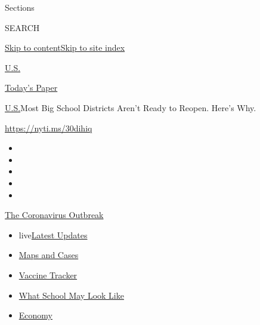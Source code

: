 Sections

SEARCH

\protect\hyperlink{site-content}{Skip to
content}\protect\hyperlink{site-index}{Skip to site index}

\href{https://www.nytimes3xbfgragh.onion/section/us}{U.S.}

\href{https://myaccount.nytimes3xbfgragh.onion/auth/login?response_type=cookie\&client_id=vi}{}

\href{https://www.nytimes3xbfgragh.onion/section/todayspaper}{Today's
Paper}

\href{/section/us}{U.S.}\textbar{}Most Big School Districts Aren't Ready
to Reopen. Here's Why.

\url{https://nyti.ms/30dihiq}

\begin{itemize}
\item
\item
\item
\item
\item
\end{itemize}

\href{https://www.nytimes3xbfgragh.onion/news-event/coronavirus?action=click\&pgtype=Article\&state=default\&region=TOP_BANNER\&context=storylines_menu}{The
Coronavirus Outbreak}

\begin{itemize}
\tightlist
\item
  live\href{https://www.nytimes3xbfgragh.onion/2020/08/02/world/coronavirus-updates.html?action=click\&pgtype=Article\&state=default\&region=TOP_BANNER\&context=storylines_menu}{Latest
  Updates}
\item
  \href{https://www.nytimes3xbfgragh.onion/interactive/2020/us/coronavirus-us-cases.html?action=click\&pgtype=Article\&state=default\&region=TOP_BANNER\&context=storylines_menu}{Maps
  and Cases}
\item
  \href{https://www.nytimes3xbfgragh.onion/interactive/2020/science/coronavirus-vaccine-tracker.html?action=click\&pgtype=Article\&state=default\&region=TOP_BANNER\&context=storylines_menu}{Vaccine
  Tracker}
\item
  \href{https://www.nytimes3xbfgragh.onion/interactive/2020/07/29/us/schools-reopening-coronavirus.html?action=click\&pgtype=Article\&state=default\&region=TOP_BANNER\&context=storylines_menu}{What
  School May Look Like}
\item
  \href{https://www.nytimes3xbfgragh.onion/live/2020/07/31/business/stock-market-today-coronavirus?action=click\&pgtype=Article\&state=default\&region=TOP_BANNER\&context=storylines_menu}{Economy}
\end{itemize}


